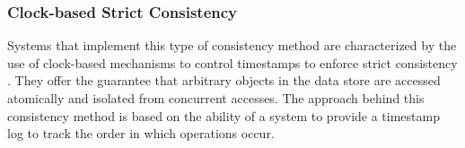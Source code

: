 


\subsubsection{Clock-based Strict Consistency}

Systems that implement this type of consistency method are characterized by the use of clock-based mechanisms to control timestamps to enforce strict consistency \cite{Corbett:2013, Du2013}. They offer the guarantee that arbitrary objects in the data store are accessed atomically and isolated from concurrent accesses. 
The approach behind this consistency method is based on the  
ability of a system to provide a timestamp log to track the order in which operations occur. 

